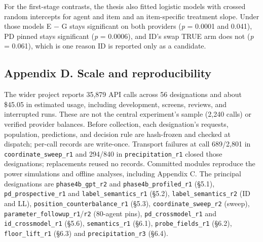 \documentclass[
  11pt]{article}
\begin{document}
For the first-stage contrasts, the thesis also fitted logistic models
with crossed random intercepts for agent and item and an item-specific
treatment slope. Under those models E − G stays significant on both
providers (\emph{p} = 0.0001 and 0.041), PD pinned stays significant
(\emph{p} = 0.0006), and ID's swap TRUE arm does not (\emph{p} = 0.061),
which is one reason ID is reported only as a candidate.

\subsection{Appendix D. Scale and
reproducibility}\label{appendix-d.-scale-and-reproducibility}

The wider project reports 35,879 API calls across 56 designations and
about \$45.05 in estimated usage, including development, screens,
reviews, and interrupted runs. These are not the central experiment's
sample (2,240 calls) or verified provider balances. Before collection,
each designation's requests, population, predictions, and decision rule
are hash-frozen and checked at dispatch; per-call records are
write-once. Transport failures at call 689/2,801 in
\texttt{coordinate\_sweep\_r1} and 294/840 in \texttt{precipitation\_r1}
closed those designations; replacements reused no records. Committed
modules reproduce the power simulations and offline analyses, including
Appendix C. The principal designations are \texttt{phase4b\_gpt\_r2} and
\texttt{phase4b\_profiled\_r1} (§5.1), \texttt{pd\_prospective\_r1} and
\texttt{label\_semantics\_r1} (§5.2), \texttt{label\_semantics\_r2} (ID
and LL), \texttt{position\_counterbalance\_r1} (§5.3),
\texttt{coordinate\_sweep\_r2} (sweep),
\texttt{parameter\_followup\_r1}/\texttt{r2} (80-agent pins),
\texttt{pd\_crossmodel\_r1} and \texttt{id\_crossmodel\_r1} (§5.6),
\texttt{semantics\_r1} (§6.1), \texttt{probe\_fields\_r1} (§6.2),
\texttt{floor\_lift\_r1} (§6.3) and \texttt{precipitation\_r3} (§6.4).
\end{document}
